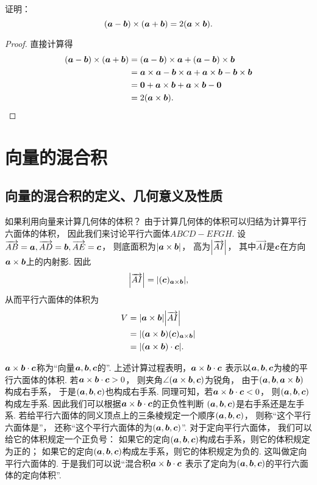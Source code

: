 \begin{example}
证明：\[
	(\vb{a}-\vb{b})\times(\vb{a}+\vb{b})
	= 2(\vb{a}\times\vb{b}).
\]
\begin{proof}
直接计算得\begin{align*}
	(\vb{a}-\vb{b})\times(\vb{a}+\vb{b})
	&= (\vb{a}-\vb{b})\times\vb{a}
	+ (\vb{a}-\vb{b})\times\vb{b} \\
	&= \vb{a}\times\vb{a}-\vb{b}\times\vb{a}
	+ \vb{a}\times\vb{b}-\vb{b}\times\vb{b} \\
	&= \vb{0}+\vb{a}\times\vb{b}
	+ \vb{a}\times\vb{b}-\vb{0} \\
	&= 2(\vb{a}\times\vb{b}).
	\qedhere
\end{align*}
\end{proof}
\end{example}

\section{向量的混合积}
\subsection{向量的混合积的定义、几何意义及性质}
如果利用向量来计算几何体的体积？
由于计算几何体的体积可以归结为计算平行六面体的体积，
因此我们来讨论平行六面体\(ABCD-EFGH\).
设\(\vec{AB}=\vb{a},
\vec{AD}=\vb{b},
\vec{AE}=\vb{c}\)，
则底面积为\(\abs{\vb{a}\times\vb{b}}\)，
高为\(\abs{\vec{AI}}\)，
其中\(\vec{AI}\)是\(\vb{c}\)在方向\(\vb{a}\times\vb{b}\)上的内射影.
因此\[
	\abs{\vec{AI}}
	= \abs{(\vb{c})_{\vb{a}\times\vb{b}}},
\]
从而平行六面体的体积为
\begin{align*}
	V &= \abs{\vb{a}\times\vb{b}} \abs{\vec{AI}} \\
	&= \abs{(\vb{a}\times\vb{b}) (\vb{c})_{\vb{a}\times\vb{b}}} \\
	&= \abs{(\vb{a}\times\vb{b})\cdot\vb{c}}.
\end{align*}

\(\vb{a}\times\vb{b}\cdot\vb{c}\)称为“向量\(\vb{a},\vb{b},\vb{c}\)的”.
上述计算过程表明，\(\vb{a}\times\vb{b}\cdot\vb{c}\)
表示以\(\vb{a},\vb{b},\vb{c}\)为棱的平行六面体的体积.
若\(\vb{a}\times\vb{b}\cdot\vb{c}>0\)，
则夹角\(\angle(\vb{a}\times\vb{b},\vb{c})\)为锐角，
由于\((\vb{a},\vb{b},\vb{a}\times\vb{b})\)构成右手系，
于是\((\vb{a},\vb{b},\vb{c})\)也构成右手系.
同理可知，若\(\vb{a}\times\vb{b}\cdot\vb{c}<0\)，
则\((\vb{a},\vb{b},\vb{c})\)构成左手系.
因此我们可以根据\(\vb{a}\times\vb{b}\cdot\vb{c}\)的正负性判断
\((\vb{a},\vb{b},\vb{c})\)是右手系还是左手系.
若给平行六面体的同义顶点上的三条棱规定一个顺序\((\vb{a},\vb{b},\vb{c})\)，
则称“这个平行六面体是”，
还称“这个平行六面体的为\((\vb{a},\vb{b},\vb{c})\)”.
对于定向平行六面体，
我们可以给它的体积规定一个正负号：
如果它的定向\((\vb{a},\vb{b},\vb{c})\)构成右手系，则它的体积规定为正的；
如果它的定向\((\vb{a},\vb{b},\vb{c})\)构成左手系，则它的体积规定为负的.
这叫做定向平行六面体的.
于是我们可以说“混合积\(\vb{a}\times\vb{b}\cdot\vb{c}\)
表示了定向为\((\vb{a},\vb{b},\vb{c})\)的平行六面体的定向体积”.

